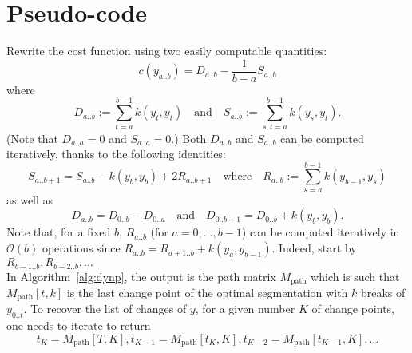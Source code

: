 \documentclass[12pt]{article}
\begin{document}
\section{Pseudo-code}
Rewrite the cost function using two easily computable quantities:
\begin{equation}
    c(y_{a..b}) = D_{a..b} - \frac{1}{b-a} S_{a..b}
\end{equation}
where
\begin{equation}
    D_{a..b} := \sum_{t=a}^{b-1} k(y_t, y_t) \quad\text{and}\quad S_{a..b} := \sum_{s,t=a}^{b-1} k(y_s,y_t).
\end{equation}
(Note that $D_{a..a}=0$ and $S_{a..a}=0$.)
Both $D_{a..b}$ and $S_{a..b}$ can be computed iteratively, thanks to the following identities:
\begin{equation}
    S_{a..b+1} = S_{a..b} -k(y_b, y_{b}) + 2 R_{a..b+1} \quad\text{where}\quad R_{a..b} :=\sum_{s=a}^{b-1} k(y_{b-1}, y_s)
\end{equation}
as well as
\begin{equation}
    D_{a..b} = D_{0..b} - D_{0..a}\quad\text{and}\quad D_{0..b+1} = D_{0..b} + k(y_b, y_b).
\end{equation}
Note that, for a fixed $b$, $R_{a..b}$ (for $a=0,\dots,b-1$) can be computed iteratively in $\mathcal{O}(b)$ operations since $R_{a..b} = R_{a+1..b} + k(y_a, y_{b-1})$.
Indeed, start by $R_{b-1..b}, R_{b-2..b},\dots$
\\
In Algorithm~\ref{alg:dynp}, the output is the path matrix $M_{\text{path}}$ which is such that $M_{\text{path}}[t, k]$ is the last change point of the optimal segmentation with $k$ breaks of $y_{0..t}$.
To recover the list of changes of $y$, for a given number $K$ of change points, one needs to iterate to return
\begin{equation*}
    t_K = M_{\text{path}}[T, K], t_{K-1}=M_{\text{path}}[t_K, K], t_{K-2}=M_{\text{path}}[t_{K-1}, K], \dots  
\end{equation*}
\end{document}

